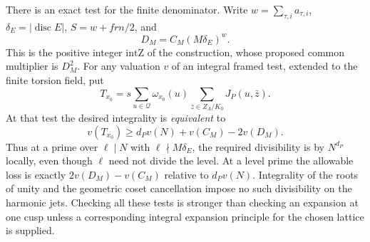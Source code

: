 There is an exact test for the finite denominator.
Write \(w=\sum_{\tau,i}a_{\tau,i}\),
\(\delta_E=|\operatorname{disc}E|\), \(S=w+frn/2\), and
\[
 D_M=C_M(M\delta_E)^w.
\]
This is the positive integer \(\mathrm{intZ}\) of the construction,
whose proposed common multiplier is \(D_M^2\).
For any valuation \(v\) of an integral framed test, extended to the
finite torsion field, put
\[
 T_{x_0}=s\sum_{u\in\mathcal Q}\omega_{x_0}(u)
                   \sum_{\bar z\in Z_\Lambda/K_0}J_P(u,\bar z).
\]
At that test the desired integrality is \emph{equivalent} to
\[
 v(T_{x_0})\ge d_P v(N)+v(C_M)-2v(D_M).
\]
Thus at a prime over \(\ell\mid N\) with
\(\ell\nmid M\delta_E\), the required divisibility is by
\(N^{d_P}\) locally, even though \(\ell\) need not divide the level.
At a level prime the allowable loss is exactly
\(2v(D_M)-v(C_M)\) relative to \(d_Pv(N)\).
Integrality of the roots of unity and the geometric coset
cancellation impose no such divisibility on the harmonic jets.
Checking all these tests is stronger than checking an expansion at
one cusp unless a corresponding integral expansion principle for
the chosen lattice is supplied.


